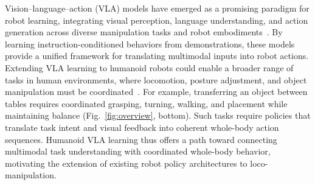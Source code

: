 







Vision--language--action (VLA) models have emerged as a promising paradigm for robot learning, integrating visual perception, language understanding, and action generation across diverse manipulation tasks and robot embodiments~\cite{rt2,openvla,pi0,wang2026limitsvisionandlanguagenavigation,wang2025dreamnavtrajectorybasedimaginativeframework}.
By learning instruction-conditioned behaviors from demonstrations, these models provide a unified framework for translating multimodal inputs into robot actions.
Extending VLA learning to humanoid robots could enable a broader range of tasks in human environments, where locomotion, posture adjustment, and object manipulation must be coordinated~\cite{grootn1,psi0,openhlm}.
For example, transferring an object between tables requires coordinated grasping, turning, walking, and placement while maintaining balance (Fig.~\ref{fig:overview}, bottom).
Such tasks require policies that translate task intent and visual feedback into coherent whole-body action sequences.
Humanoid VLA learning thus offers a path toward connecting multimodal task understanding with coordinated whole-body behavior, motivating the extension of existing robot policy architectures to loco-manipulation.





